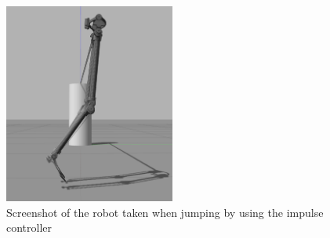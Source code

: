 \begin{figure}[hb]
    \centering
    \includegraphics[width=0.5\textwidth]{figures/gazebo_jumping.png}
    \caption{Screenshot of the robot taken when jumping by using the impulse controller}
    \label{fig:gazebo_jumping}
\end{figure}


